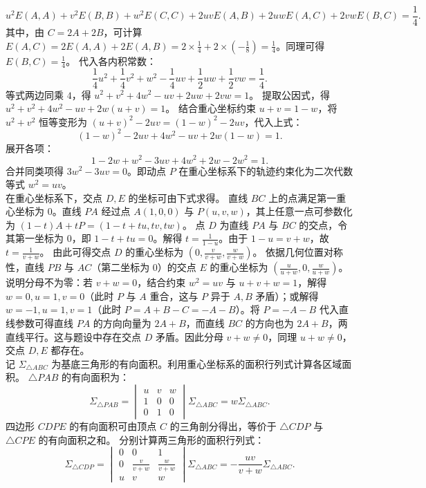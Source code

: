 \begin{solution}
\[
u^2 E(A, A) + v^2 E(B, B) + w^2 E(C, C) + 2uv E(A, B) + 2uw E(A, C) + 2vw E(B, C) = \frac{1}{4}.
\]
其中，由 $C=2A+2B$，可计算 $E(A,C) = 2E(A,A) + 2E(A,B) = 2 \times \frac{1}{4} + 2 \times \left(-\frac{1}{8}\right) = \frac{1}{4}$。同理可得 $E(B,C) = \frac{1}{4}$。
代入各内积常数：
\[
\frac{1}{4}u^2 + \frac{1}{4}v^2 + w^2 - \frac{1}{4}uv + \frac{1}{2}uw + \frac{1}{2}vw = \frac{1}{4}.
\]
等式两边同乘 $4$，得 $u^2 + v^2 + 4w^2 - uv + 2uw + 2vw = 1$。
提取公因式，得 $u^2 + v^2 + 4w^2 - uv + 2w(u+v) = 1$。
结合重心坐标约束 $u+v = 1-w$，将 $u^2+v^2$ 恒等变形为 $(u+v)^2 - 2uv = (1-w)^2 - 2uv$，代入上式：
\[
(1-w)^2 - 2uv + 4w^2 - uv + 2w(1-w) = 1.
\]
展开各项：
\[
1 - 2w + w^2 - 3uv + 4w^2 + 2w - 2w^2 = 1.
\]
合并同类项得 $3w^2 - 3uv = 0$。即动点 $P$ 在重心坐标系下的轨迹约束化为二次代数等式 $w^2 = uv$。\\
在重心坐标系下，交点 $D,E$ 的坐标可由下式求得。
直线 $BC$ 上的点满足第一重心坐标为 $0$。直线 $PA$ 经过点 $A(1,0,0)$ 与 $P(u,v,w)$，其上任意一点可参数化为 $(1-t)A + tP = (1-t+tu, tv, tw)$。
点 $D$ 为直线 $PA$ 与 $BC$ 的交点，令其第一坐标为 $0$，即 $1 - t + tu = 0$。解得 $t = \frac{1}{1-u}$。由于 $1-u = v+w$，故 $t = \frac{1}{v+w}$。
由此可得交点 $D$ 的重心坐标为 $\left(0, \frac{v}{v+w}, \frac{w}{v+w}\right)$。
依据几何位置对称性，直线 $PB$ 与 $AC$（第二坐标为 $0$）的交点 $E$ 的重心坐标为 $\left(\frac{u}{u+w}, 0, \frac{w}{u+w}\right)$。
说明分母不为零：若 $v+w=0$，结合约束 $w^2=uv$ 与 $u+v+w=1$，解得 $w=0, u=1, v=0$（此时 $P$ 与 $A$ 重合，这与 $P$ 异于 $A,B$ 矛盾）；或解得 $w=-1, u=1, v=1$（此时 $P = A+B-C = -A-B$）。将 $P = -A-B$ 代入直线参数可得直线 $PA$ 的方向向量为 $2A+B$，而直线 $BC$ 的方向也为 $2A+B$，两直线平行。这与题设中存在交点 $D$ 矛盾。因此分母 $v+w \neq 0$，同理 $u+w \neq 0$，交点 $D, E$ 都存在。\\
记 $\Sigma_{\triangle ABC}$ 为基底三角形的有向面积。利用重心坐标系的面积行列式计算各区域面积。
$\triangle PAB$ 的有向面积为：
\[
\Sigma_{\triangle PAB} = \begin{vmatrix} u & v & w \\ 1 & 0 & 0 \\ 0 & 1 & 0 \end{vmatrix} \Sigma_{\triangle ABC} = w \Sigma_{\triangle ABC}.
\]
四边形 $CDPE$ 的有向面积可由顶点 $C$ 的三角剖分得出，等价于 $\triangle CDP$ 与 $\triangle CPE$ 的有向面积之和。
分别计算两三角形的面积行列式：
\[
\Sigma_{\triangle CDP} = \begin{vmatrix} 0 & 0 & 1 \\ 0 & \frac{v}{v+w} & \frac{w}{v+w} \\ u & v & w \end{vmatrix} \Sigma_{\triangle ABC} = -\frac{uv}{v+w} \Sigma_{\triangle ABC}.
\]
\end{solution}
